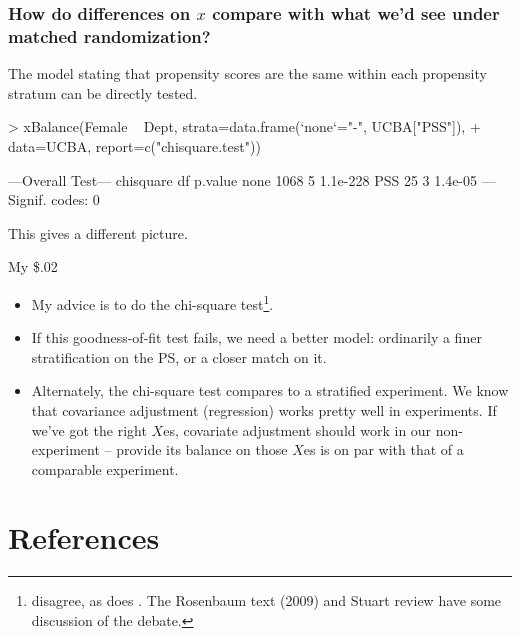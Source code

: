 \begin{frame}[fragile]
\frametitle[Compare to matched randomization]{How do differences on $x$ compare with what we'd see under matched randomization?}

The model stating that propensity scores are the same within each
propensity stratum can be directly tested.

\begin{Schunk}
\begin{Sinput}
> xBalance(Female ~ Dept, strata=data.frame(`none`="-", UCBA["PSS"]), 
+ data=UCBA, report=c("chisquare.test"))
\end{Sinput}
\begin{Soutput}
---Overall Test---
     chisquare df  p.value
none      1068  5 1.1e-228
PSS         25  3  1.4e-05
---
Signif. codes:  0 
\end{Soutput}
\end{Schunk}

This gives a different picture.
\end{frame}

\begin{frame}{My \$.02}
 
  \begin{itemize}
  \item My advice \citep{hansen:bowers:2008,hansen:statmed:2008} is to
    do the chi-square test\footnote{\citet*{imaiKingStuart:2007}
      disagree, as does \citet*{austin2008critical}.  The Rosenbaum
      text (2009) and Stuart review \citeyearpar{stuart2010matching} have some discussion of the debate.}.
  \item If this goodness-of-fit test fails, we need a better model:
    ordinarily a finer stratification on the PS, or a closer match on it.
  \item Alternately, the chi-square test compares to a stratified
    experiment.  We know that covariance adjustment (regression) works
    pretty well in experiments.  If we've got the right $X$es,
    covariate adjustment should work in our non-experiment -- provide
    its balance on those $X$es is on par with that of a comparable experiment.
  \end{itemize}
  
  
  
\end{frame}

\section*{References}

